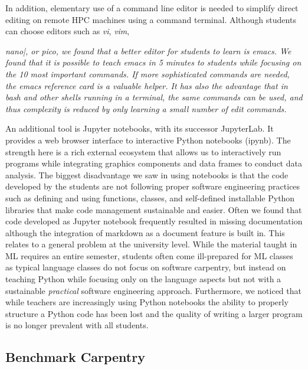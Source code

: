 \documentclass[utf8]{FrontiersinVancouver} %
\begin{document}
In addition, elementary use of a command line editor is needed to
simplify direct editing on remote HPC machines using a command
terminal. Although students can choose editors such as {\em vi}, {\em
  vim}, {\em nano|, or {\em pico}, we found that a better editor for
  students to learn is {\em emacs}. We found that it is possible to
  teach emacs in 5 minutes to students while focusing on the 10 most
  important commands. If more sophisticated commands are needed, the
  emacs reference card is a valuable helper. It has also the advantage
  that in bash and other shells running in a terminal, the same
  commands can be used, and thus complexity is reduced by only
  learning a small number of edit commands.

  An additional tool is Jupyter notebooks, with its successor
  JupyterLab. It provides a web browser interface to interactive
  Python notebooks (ipynb). The strength here is a rich external
  ecosystem that allows us to interactively run programs while
  integrating graphics components and data frames to conduct data
  analysis.  The biggest disadvantage we saw in using notebooks is
  that the code developed by the students are not following proper
  software engineering practices such as defining and using functions,
  classes, and self-defined installable Python libraries that make
  code management sustainable and easier. Often we found that code
  developed as Jupyter notebook frequently resulted in missing
  documentation although the integration of markdown as a document
  feature is built in. This relates to a general problem at the
  university level. While the material taught in ML requires an entire
  semester, students often come ill-prepared for ML classes as typical
  language classes do not focus on software carpentry, but instead on
  teaching Python while focusing only on the language aspects but not
  with a sustainable {\em practical} software engineering
  approach. Furthermore, we noticed that while teachers are
  increasingly using Python notebooks the ability to properly
  structure a Python code has been lost and the quality of writing a
  larger program is no longer prevalent with all students.

\subsection{Benchmark Carpentry}

}
\end{document}
